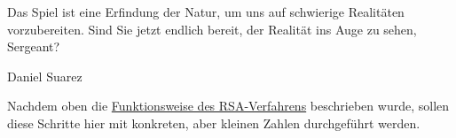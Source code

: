 \begin{refsegment}
\begin{ctsquote}
\glqq Das Spiel ist eine Erfindung der Natur, um uns auf schwierige Realitäten vorzubereiten. Sind Sie jetzt endlich bereit, der Realität ins Auge zu sehen, Sergeant?\grqq
\caption[Daniel Suarez]{Daniel Suarez\footnotemark}
\end{ctsquote}
\addtocounter{footnote}{0}

Nachdem oben die \hyperlink{RSA}{Funktionsweise des RSA-Verfahrens} beschrieben
wurde, sollen diese Schritte hier mit konkreten, aber kleinen Zahlen
durchgeführt werden.



\end{refsegment}
